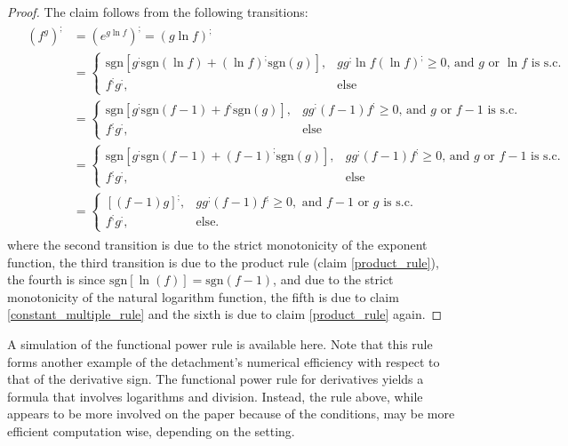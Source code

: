 \documentclass[11pt]{book}
\begin{document}
\begin{proof}The claim follows from the following transitions: \begin{align}
&\begin{aligned}
\left(f^{g}\right)^{;} & =\left(e^{g\ln f}\right)^{;}=\left(g\ln f\right)^{;}\\
& =\begin{cases}
\text{sgn}\left[g^{;}\text{sgn}\left(\ln f\right)+\left(\ln f\right)^{;}\text{sgn}\left(g\right)\right], & gg^{;}\ln f\left(\ln f\right)^{;}\geq0\text{, and }g\text{ or }\ln f\text{ is s.c.}\\
f^{;}g^{;}, & \text{else}
\end{cases}\\
& =\begin{cases}
\text{sgn}\left[g^{;}\text{sgn}\left(f-1\right)+f^{;}\text{sgn}\left(g\right)\right], & gg^{;}\left(f-1\right)f^{;}\geq0\text{, and }g\text{ or }f-1\text{ is s.c.}\\
f^{;}g^{;}, & \text{else}
\end{cases}\\
& =\begin{cases}
\text{sgn}\left[g^{;}\text{sgn}\left(f-1\right)+\left(f-1\right)^{;}\text{sgn}\left(g\right)\right], & gg^{;}\left(f-1\right)f^{;}\geq0\text{, and }g\text{ or }f-1\text{ is s.c.}\\
f^{;}g^{;}, & \text{else}
\end{cases}\\
& =\begin{cases}
\left[\left(f-1\right)g\right]^{;}, & gg^{;}\left(f-1\right)f^{;}\geq0,\text{ and }f-1\text{ or }g\text{ is s.c.}\\
f^{;}g^{;}, & \text{else.}
\end{cases}
\end{aligned}
\end{align}
where the second transition is due to the strict monotonicity of the exponent function, the third transition is due to the product rule (claim \ref{product_rule}), the fourth is since $\text{sgn}\left[\ln\left(f\right)\right]=\text{sgn}\left(f-1\right)$, and due to the strict monotonicity of the natural logarithm function, the fifth is due to claim \ref{constant_multiple_rule} and the sixth is due to claim \ref{product_rule} again.
\end{proof}

A simulation of the functional power rule is available here. Note that this rule forms another example of the detachment's numerical efficiency with respect to that of the derivative sign. The functional power rule for derivatives yields a formula that involves logarithms and division. Instead, the rule above, while appears to be more involved on the paper because of the conditions, may be more efficient computation wise, depending on the setting.
\end{document}
